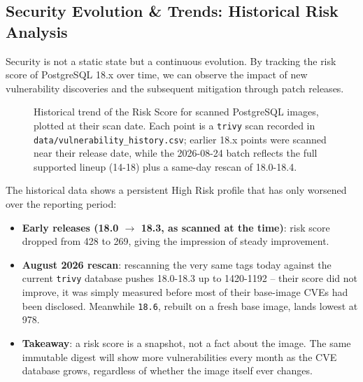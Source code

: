\documentclass[11pt, a4paper]{article}
\begin{document}
\subsection{Security Evolution \& Trends: Historical Risk Analysis}
\label{subsec:risk-trend}

Security is not a static state but a continuous evolution. By tracking the risk score of PostgreSQL 18.x over time, we can observe the impact of new vulnerability discoveries and the subsequent mitigation through patch releases.

\begin{figure}[htbp]
\centering
{}
\caption{Historical trend of the Risk Score for scanned PostgreSQL images, plotted at their scan date. Each point is a \texttt{trivy} scan recorded in \texttt{data/vulnerability\_history.csv}; earlier 18.x points were scanned near their release date, while the 2026-08-24 batch reflects the full supported lineup (14-18) plus a same-day rescan of 18.0-18.4.}
\label{fig:risk-trend-chart}
\end{figure}

\begin{tcolorbox}[colback=lightgreen!20, colframe=gantt-supported, title=📈 Analyzing the Trend, fonttitle=\bfseries]
The historical data shows a persistent High Risk profile that has only worsened over the reporting period:
\begin{itemize}
    \item \textbf{Early releases (18.0 $\rightarrow$ 18.3, as scanned at the time)}: risk score dropped from 428 to 269, giving the impression of steady improvement.
    \item \textbf{August 2026 rescan}: rescanning the very same tags today against the current \texttt{trivy} database pushes 18.0-18.3 up to 1420-1192 -- their score did not improve, it was simply measured before most of their base-image CVEs had been disclosed. Meanwhile \texttt{18.6}, rebuilt on a fresh base image, lands lowest at 978.
    \item \textbf{Takeaway}: a risk score is a snapshot, not a fact about the image. The same immutable digest will show more vulnerabilities every month as the CVE database grows, regardless of whether the image itself ever changes.
\end{itemize}
\end{tcolorbox}
\end{document}
